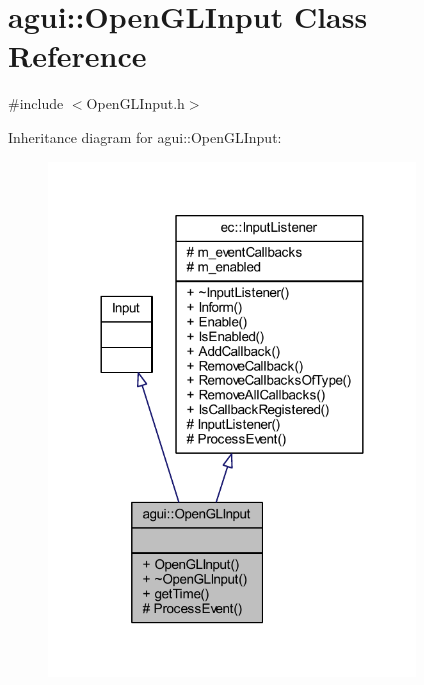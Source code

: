 \hypertarget{classagui_1_1_open_g_l_input}{}\section{agui\+:\+:Open\+G\+L\+Input Class Reference}
\label{classagui_1_1_open_g_l_input}


{\ttfamily \#include $<$Open\+G\+L\+Input.\+h$>$}



Inheritance diagram for agui\+:\+:Open\+G\+L\+Input\+:
\nopagebreak
\begin{figure}[H]
\begin{center}
\leavevmode
\includegraphics[width=276pt]{classagui_1_1_open_g_l_input__inherit__graph}
\end{center}
\end{figure}


